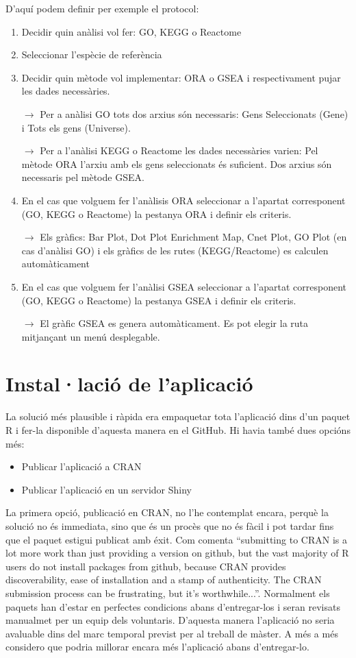 \documentclass[]{article}
\begin{document}
D'aquí podem definir per exemple el protocol:
\begin{enumerate}
\item Decidir quin anàlisi vol fer: GO, KEGG o Reactome
\item Seleccionar l'espècie de referència
\item Decidir quin mètode vol implementar: ORA o GSEA i respectivament pujar les dades necessàries.

$\rightarrow$ Per a anàlisi GO tots dos arxius són necessaris: Gens Seleccionats (Gene) i Tots els gens (Universe). 

$\rightarrow$ Per a l'anàlisi KEGG o Reactome les dades necessàries varien: Pel mètode ORA l'arxiu amb els gens seleccionats és suficient. Dos arxius són necessaris pel mètode GSEA.
\item En el cas que volguem fer l'anàlisis ORA seleccionar a l'apartat corresponent (GO, KEGG o Reactome) la pestanya ORA i definir els criteris.

$\rightarrow$ Els gràfics: Bar Plot, Dot Plot Enrichment Map, Cnet Plot, GO Plot (en cas d'anàlisi GO) i els gràfics de les rutes (KEGG/Reactome) es calculen automàticament

\item En el cas que volguem fer l'anàlisi GSEA seleccionar a l'apartat corresponent (GO, KEGG o Reactome) la pestanya GSEA i definir els criteris.

$\rightarrow$ El gràfic GSEA es genera automàticament. Es pot elegir la ruta mitjançant un menú desplegable.

\end{enumerate}


\section{Instal·lació de l'aplicació}

La solució més plausible i ràpida era empaquetar tota l'aplicació dins d'un paquet R i fer-la disponible d'aquesta manera en el GitHub. Hi havia també dues opcións més: 

\begin{itemize}
\item Publicar l'aplicació a CRAN
\item Publicar l'aplicació en un servidor Shiny
\end{itemize}
La primera opció, publicació en CRAN, no l’he contemplat encara, perquè la solució no és immediata, sino que és un procès que no és fàcil i pot tardar fins que el paquet estigui
 publicat amb éxit. Com comenta \cite{HWick} \enquote{submitting to CRAN is a lot more work than just providing a version on github, but the vast majority of R users do not install packages from github, because CRAN provides discoverability, ease of installation and a stamp of authenticity. The CRAN submission process can be frustrating, but it’s worthwhile...}. Normalment els paquets han d’estar en perfectes condicions abans d'entregar-los i seran revisats manualmet per un equip dels voluntaris. D'aquesta manera l'aplicació no seria avaluable dins del marc temporal previst per al treball de màster. A més a més considero que podria millorar encara més l'aplicació abans d'entregar-lo.
\end{document}
